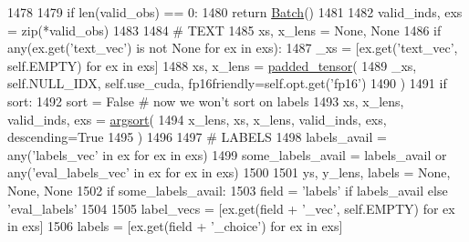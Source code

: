 \begin{DoxyCode}
1478 
1479         \textcolor{keywordflow}{if} len(valid\_obs) == 0:
1480             \textcolor{keywordflow}{return} \hyperlink{namespaceparlai_1_1agents_1_1legacy__agents_1_1seq2seq_1_1torch__agent__v1_a74cfde390a2b9861179ac0fcd59da28c}{Batch}()
1481 
1482         valid\_inds, exs = zip(*valid\_obs)
1483 
1484         \textcolor{comment}{# TEXT}
1485         xs, x\_lens = \textcolor{keywordtype}{None}, \textcolor{keywordtype}{None}
1486         \textcolor{keywordflow}{if} any(ex.get(\textcolor{stringliteral}{'text\_vec'}) \textcolor{keywordflow}{is} \textcolor{keywordflow}{not} \textcolor{keywordtype}{None} \textcolor{keywordflow}{for} ex \textcolor{keywordflow}{in} exs):
1487             \_xs = [ex.get(\textcolor{stringliteral}{'text\_vec'}, self.EMPTY) \textcolor{keywordflow}{for} ex \textcolor{keywordflow}{in} exs]
1488             xs, x\_lens = \hyperlink{namespaceparlai_1_1agents_1_1legacy__agents_1_1seq2seq_1_1utils__v1_adb5a414ae439f14c54e8c760b91cc4c8}{padded\_tensor}(
1489                 \_xs, self.NULL\_IDX, self.use\_cuda, fp16friendly=self.opt.get(\textcolor{stringliteral}{'fp16'})
1490             )
1491             \textcolor{keywordflow}{if} sort:
1492                 sort = \textcolor{keyword}{False}  \textcolor{comment}{# now we won't sort on labels}
1493                 xs, x\_lens, valid\_inds, exs = \hyperlink{namespaceparlai_1_1agents_1_1legacy__agents_1_1seq2seq_1_1utils__v1_a1521e559b740f741ebb47b8755202bb2}{argsort}(
1494                     x\_lens, xs, x\_lens, valid\_inds, exs, descending=\textcolor{keyword}{True}
1495                 )
1496 
1497         \textcolor{comment}{# LABELS}
1498         labels\_avail = any(\textcolor{stringliteral}{'labels\_vec'} \textcolor{keywordflow}{in} ex \textcolor{keywordflow}{for} ex \textcolor{keywordflow}{in} exs)
1499         some\_labels\_avail = labels\_avail \textcolor{keywordflow}{or} any(\textcolor{stringliteral}{'eval\_labels\_vec'} \textcolor{keywordflow}{in} ex \textcolor{keywordflow}{for} ex \textcolor{keywordflow}{in} exs)
1500 
1501         ys, y\_lens, labels = \textcolor{keywordtype}{None}, \textcolor{keywordtype}{None}, \textcolor{keywordtype}{None}
1502         \textcolor{keywordflow}{if} some\_labels\_avail:
1503             field = \textcolor{stringliteral}{'labels'} \textcolor{keywordflow}{if} labels\_avail \textcolor{keywordflow}{else} \textcolor{stringliteral}{'eval\_labels'}
1504 
1505             label\_vecs = [ex.get(field + \textcolor{stringliteral}{'\_vec'}, self.EMPTY) \textcolor{keywordflow}{for} ex \textcolor{keywordflow}{in} exs]
1506             labels = [ex.get(field + \textcolor{stringliteral}{'\_choice'}) \textcolor{keywordflow}{for} ex \textcolor{keywordflow}{in} exs]

\end{DoxyCode}
